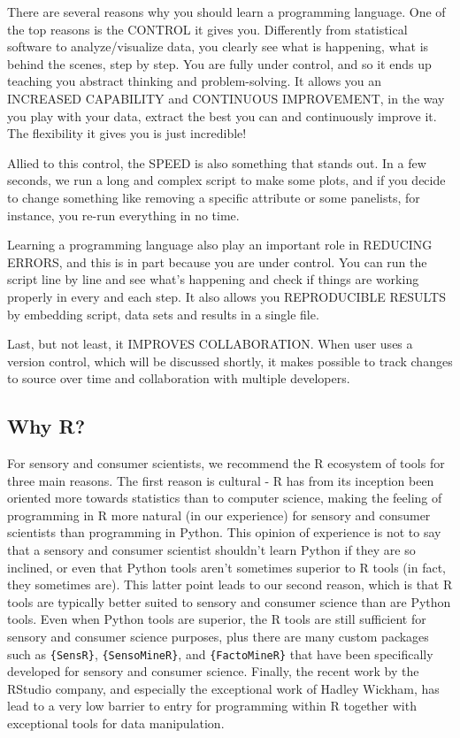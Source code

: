 \documentclass[
]{book}
\begin{document}
There are several reasons why you should learn a programming language. One of the top reasons is the CONTROL it gives you. Differently from statistical software to analyze/visualize data, you clearly see what is happening, what is behind the scenes, step by step. You are fully under control, and so it ends up teaching you abstract thinking and problem-solving. It allows you an INCREASED CAPABILITY and CONTINUOUS IMPROVEMENT, in the way you play with your data, extract the best you can and continuously improve it. The flexibility it gives you is just incredible!

Allied to this control, the SPEED is also something that stands out. In a few seconds, we run a long and complex script to make some plots, and if you decide to change something like removing a specific attribute or some panelists, for instance, you re-run everything in no time.

Learning a programming language also play an important role in REDUCING ERRORS, and this is in part because you are under control. You can run the script line by line and see what's happening and check if things are working properly in every and each step. It also allows you REPRODUCIBLE RESULTS by embedding script, data sets and results in a single file.

Last, but not least, it IMPROVES COLLABORATION. When user uses a version control, which will be discussed shortly, it makes possible to track changes to source over time and collaboration with multiple developers.

\hypertarget{why-r}{%
\subsection{Why R?}\label{why-r}}

For sensory and consumer scientists, we recommend the R ecosystem of tools for three main reasons. The first reason is cultural - R has from its inception been oriented more towards statistics than to computer science, making the feeling of programming in R more natural (in our experience) for sensory and consumer scientists than programming in Python. This opinion of experience is not to say that a sensory and consumer scientist shouldn't learn Python if they are so inclined, or even that Python tools aren't sometimes superior to R tools (in fact, they sometimes are). This latter point leads to our second reason, which is that R tools are typically better suited to sensory and consumer science than are Python tools. Even when Python tools are superior, the R tools are still sufficient for sensory and consumer science purposes, plus there are many custom packages such as \texttt{\{SensR\}}, \texttt{\{SensoMineR\}}, and \texttt{\{FactoMineR\}} that have been specifically developed for sensory and consumer science. Finally, the recent work by the RStudio company, and especially the exceptional work of Hadley Wickham, has lead to a very low barrier to entry for programming within R together with exceptional tools for data manipulation.
\end{document}
